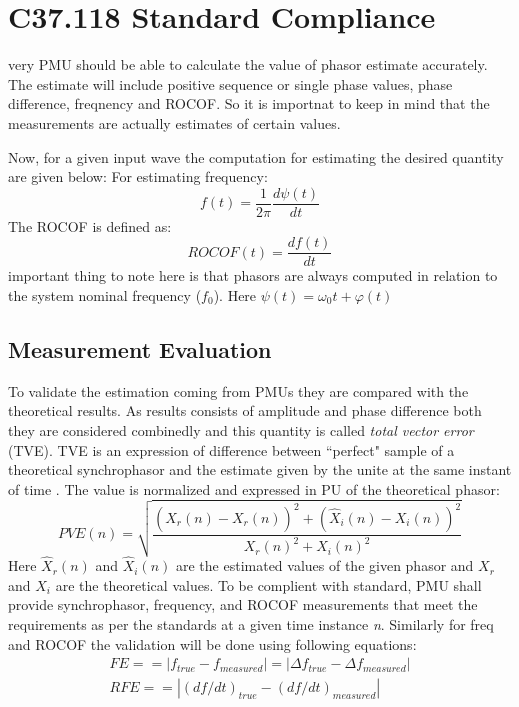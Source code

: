 \section{C37.118 Standard Compliance}
very PMU should be able to calculate the value of phasor estimate accurately. The estimate will include positive sequence or single phase values, phase difference, freqnency and ROCOF. So it is importnat to keep in mind that the measurements are actually estimates of certain values.

Now, for a given input wave the computation for estimating the desired quantity are given below:
For estimating frequency:
\begin{equation}
f(t) = \frac{1}{2\pi} \dfrac{d\psi(t)}{dt}
\end{equation}
The ROCOF is defined as:
\begin{equation}
ROCOF(t) = \dfrac{df(t)}{dt}
\end{equation}
important thing to note here is that phasors are always computed in relation to the system nominal frequency ($f_0$). Here $\psi(t) = \omega_0 t + \varphi(t)$

\subsection{Measurement Evaluation}
To validate the estimation coming from PMUs they are compared with the theoretical results. As results consists of amplitude and phase difference both they are considered combinedly and this quantity is called \textit{total vector error} (TVE). TVE is an expression of difference between ``perfect" sample of a theoretical synchrophasor and the estimate given by the unite at the same instant of time \cite{std:c37}. The value is normalized and expressed in PU of the theoretical phasor:
\begin{equation}
PVE(n) = \sqrt{\frac{ (\hat{X}_r(n) - X_r(n))^2 + (\hat{X}_i(n)-X_i(n))^2} {X_r(n)^2 + X_i(n)^2}}
\end{equation}
Here $ \hat{X}_r (n)$ and $\hat{X}_i(n) $ are the estimated values of the given phasor and $X_r$ and $X_i$ are the theoretical values.
To be complient with standard, PMU shall provide synchrophasor, frequency, and ROCOF measurements that meet the requirements as per the standards at a given time instance \textit{n}. Similarly for freq and ROCOF the validation will be done using following equations:
\begin{eqnarray}
FE == |f_{true}-f_{measured}| = |\Delta f_{true}-\Delta f_{measured}| \\
RFE == |(df/dt)_{true}-(df/dt)_{measured} |
\end{eqnarray}


